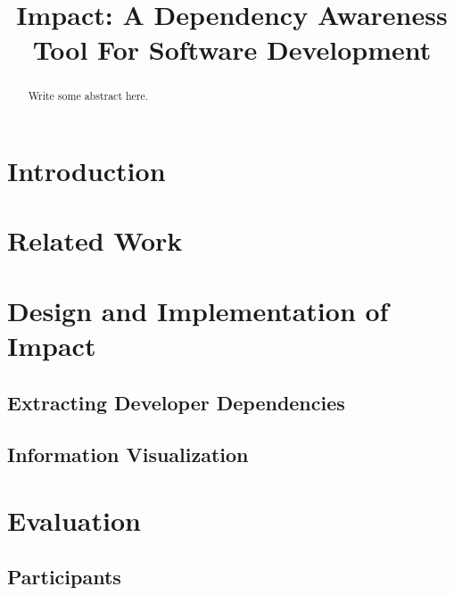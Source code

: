 \documentclass[conference]{IEEEtran}
\begin{document}
\title{Impact: A Dependency Awareness Tool For Software Development}

\author{
\and
{}
}

\maketitle

\begin{abstract}
Write some abstract here.
\end{abstract}


\section{Introduction}

\section{Related Work}

\section{Design and Implementation of Impact}

\subsection{Extracting Developer Dependencies}

\subsection{Information Visualization}

\section{Evaluation}

\subsection{Participants}
\end{document}
